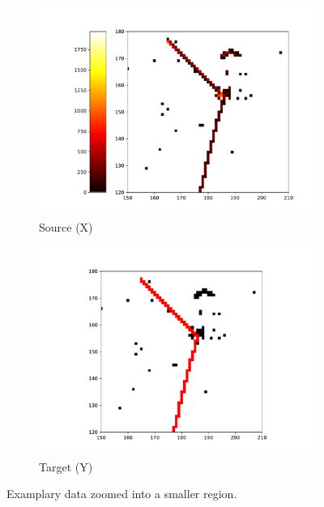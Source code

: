 \begin{figure}[H]
\centering
\begin{subfigure}[b]{0.67\textwidth}
    \centering
    \includegraphics[width=\linewidth]{figures/chapter7/examplary_data_zoom_source.pdf}
\caption{Source (X)}
   \label{plot:lartpc-example-source-zoom}
  \end{subfigure}
\begin{subfigure}[b]{0.67\textwidth}
    \centering
    \includegraphics[width=\linewidth]{figures/chapter7/examplary_data_zoom_target.pdf}
\caption{Target (Y)}
    \label{plot:lartpc-example-target-zoom}
  \end{subfigure}
  \caption[Examples of zoom]{Examplary data zoomed into a smaller region.}

    \label{plot:lartpc-example-zoom}
\end{figure}



